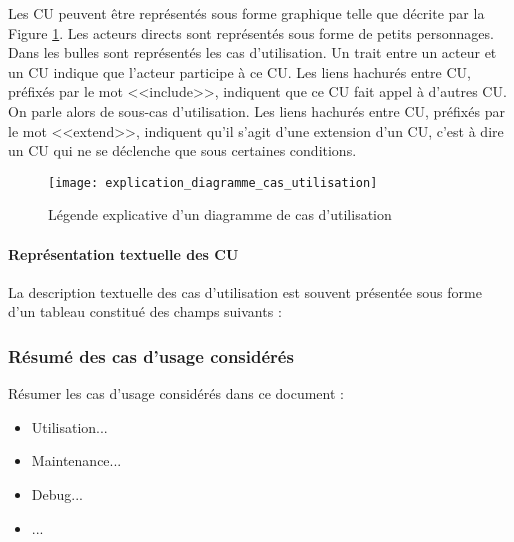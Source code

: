 Les CU peuvent être représentés sous forme graphique telle que décrite par la Figure \ref{fig:explication_diagramme_cas_utilisation}. Les acteurs directs sont représentés sous forme de petits personnages. Dans les bulles sont représentés les cas d’utilisation. Un trait entre un acteur et un CU indique que l’acteur participe à ce CU. Les liens hachurés entre CU, préfixés par le mot <<include>>, indiquent que ce CU fait appel à d’autres CU. On parle alors de sous-cas d’utilisation. Les liens hachurés entre CU, préfixés par le mot <<extend>>, indiquent qu’il s’agit d’une extension d’un CU, c'est à dire un CU qui ne se déclenche que sous certaines conditions.

\begin{figure}[H]
    \centering
    \texttt{[image: explication\_diagramme\_cas\_utilisation]}
    \caption{Légende explicative d'un diagramme de cas d'utilisation}
    \label{fig:explication_diagramme_cas_utilisation}
\end{figure}

\bigskip
\paragraph{Représentation textuelle des CU} %

La description textuelle des cas d’utilisation est souvent présentée sous forme d’un tableau constitué des champs suivants :


\subsubsection{Résumé des cas d'usage considérés} \label{section:resume_cas_d'usage}%

\complete Résumer les cas d'usage considérés dans ce document :
\begin{itemize}
    \item \complete Utilisation...
    \item \complete Maintenance...
    \item \complete Debug...
    \item \complete ...
\end{itemize}

\newpage


\newpage
